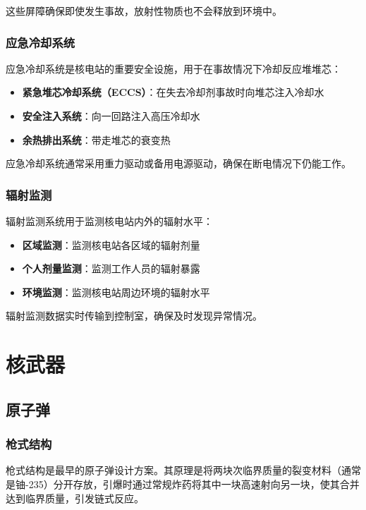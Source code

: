 \documentclass[12pt,UTF8]{ctexbook}
\begin{document}
这些屏障确保即使发生事故，放射性物质也不会释放到环境中。

\section{应急冷却系统}

应急冷却系统是核电站的重要安全设施，用于在事故情况下冷却反应堆堆芯：

\begin{itemize}[leftmargin=2cm]
    \item \textbf{紧急堆芯冷却系统（ECCS）}：在失去冷却剂事故时向堆芯注入冷却水
    \item \textbf{安全注入系统}：向一回路注入高压冷却水
    \item \textbf{余热排出系统}：带走堆芯的衰变热
\end{itemize}

应急冷却系统通常采用重力驱动或备用电源驱动，确保在断电情况下仍能工作。

\section{辐射监测}

辐射监测系统用于监测核电站内外的辐射水平：

\begin{itemize}[leftmargin=2cm]
    \item \textbf{区域监测}：监测核电站各区域的辐射剂量
    \item \textbf{个人剂量监测}：监测工作人员的辐射暴露
    \item \textbf{环境监测}：监测核电站周边环境的辐射水平
\end{itemize}

辐射监测数据实时传输到控制室，确保及时发现异常情况。

\part{核武器}

\chapter{原子弹}

\section{枪式结构}

枪式结构是最早的原子弹设计方案。其原理是将两块次临界质量的裂变材料（通常是铀-235）分开存放，引爆时通过常规炸药将其中一块高速射向另一块，使其合并达到临界质量，引发链式反应。
\end{document}
